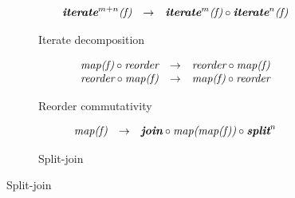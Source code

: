 \setlength{\ruleSpace}{-1em}
\begin{figure}[t]
\centering

\begin{subfigure}[b]{1\linewidth}
\begin{mdframed}
$$
\begin{array}{lrl}
  \textit{\textbf{iterate}}^{m+n}\textit{(f)} & \rightarrow & \textit{\textbf{iterate}}^m\textit{(f)} \circ \textit{\textbf{iterate}}^n\textit{(f)}\\
  \end{array}
$$
\end{mdframed}
  \caption{Iterate decomposition}
  \label{fig:algo:iterate}
\end{subfigure}

\vspace{\ruleSpace}
\begin{subfigure}[b]{1\linewidth}
\begin{mdframed}
$$
\begin{array}{lrl}
  \textit{map(f)} \circ \textit{reorder} & \rightarrow & \textit{reorder} \circ \textit{map(f)}\\
  \textit{reorder} \circ \textit{map(f)} & \rightarrow & \textit{map(f)} \circ \textit{reorder}\\  
\end{array}
$$
\end{mdframed}
  \caption{Reorder commutativity}
  \label{fig:algo:reorder}
\end{subfigure}

\vspace{\ruleSpace}
\begin{subfigure}[b]{1\linewidth}
\begin{mdframed}
$$
\begin{array}{lrl}
  \textit{map(f)} & \rightarrow & \textit{\textbf{join}} \circ \textit{map(map(f))}\circ \textit{\textbf{split}}^n
\end{array}
$$
\end{mdframed}
  \caption{Split-join}
  \label{fig:algo:splitjoin}
\end{subfigure}


\end{figure}
